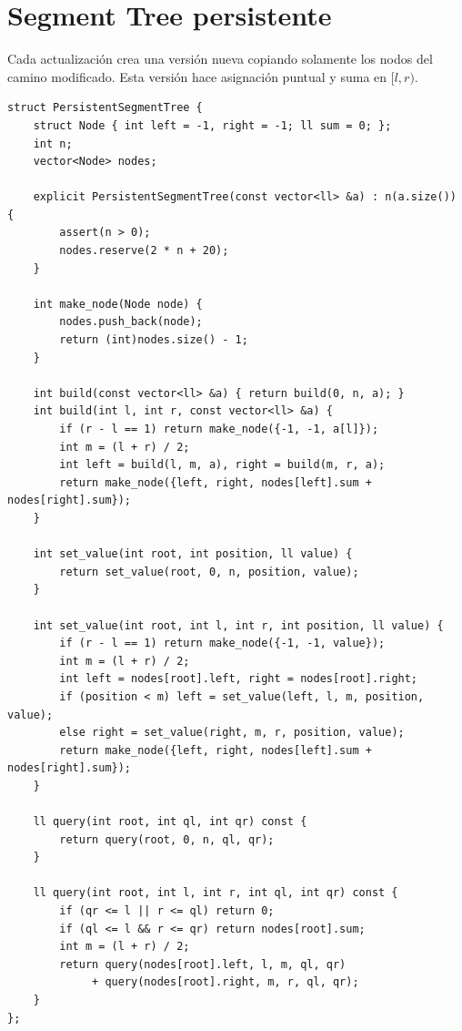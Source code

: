 \section{Segment Tree persistente}

Cada actualizaci\'on crea una versi\'on nueva copiando solamente los nodos del
camino modificado. Esta versi\'on hace asignaci\'on puntual y suma en $[l,r)$.


\begin{lstlisting}[style=cpp]
struct PersistentSegmentTree {
    struct Node { int left = -1, right = -1; ll sum = 0; };
    int n;
    vector<Node> nodes;

    explicit PersistentSegmentTree(const vector<ll> &a) : n(a.size()) {
        assert(n > 0);
        nodes.reserve(2 * n + 20);
    }

    int make_node(Node node) {
        nodes.push_back(node);
        return (int)nodes.size() - 1;
    }

    int build(const vector<ll> &a) { return build(0, n, a); }
    int build(int l, int r, const vector<ll> &a) {
        if (r - l == 1) return make_node({-1, -1, a[l]});
        int m = (l + r) / 2;
        int left = build(l, m, a), right = build(m, r, a);
        return make_node({left, right, nodes[left].sum + nodes[right].sum});
    }

    int set_value(int root, int position, ll value) {
        return set_value(root, 0, n, position, value);
    }

    int set_value(int root, int l, int r, int position, ll value) {
        if (r - l == 1) return make_node({-1, -1, value});
        int m = (l + r) / 2;
        int left = nodes[root].left, right = nodes[root].right;
        if (position < m) left = set_value(left, l, m, position, value);
        else right = set_value(right, m, r, position, value);
        return make_node({left, right, nodes[left].sum + nodes[right].sum});
    }

    ll query(int root, int ql, int qr) const {
        return query(root, 0, n, ql, qr);
    }

    ll query(int root, int l, int r, int ql, int qr) const {
        if (qr <= l || r <= ql) return 0;
        if (ql <= l && r <= qr) return nodes[root].sum;
        int m = (l + r) / 2;
        return query(nodes[root].left, l, m, ql, qr)
             + query(nodes[root].right, m, r, ql, qr);
    }
};
\end{lstlisting}

